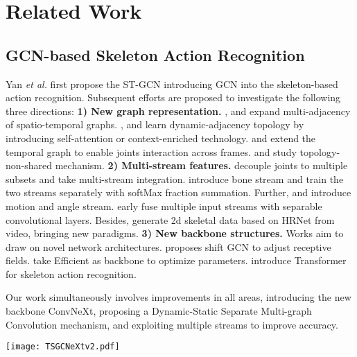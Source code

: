 \documentclass[10pt,twocolumn,letterpaper]{article}
\newcommand{\method}{TSGCNeXt\xspace}
\begin{document}
\section{Related Work}
\label{sec:related}
\subsection{GCN-based Skeleton Action Recognition}
\label{ssec:related_skeleton}
Yan \textit{et al.}\cite{yan2018spatial} first propose the ST-GCN introducing GCN into the skeleton-based action recognition. Subsequent efforts are proposed to investigate the following three directions:
\textbf{1) New graph representation.} \cite{li2019actional}, \cite{huang2020spatio} and \cite{liu2020disentangling} expand multi-adjacency of spatio-temporal graphs. \cite{shi2019two}, \cite{zhang2020semantics} and \cite{ye2020dynamic} learn dynamic-adjacency topology by introducing self-attention or context-enriched technology. \cite{obinata2021temporal} and \cite{zeng2021learning} extend the temporal graph to enable joints interaction across frames. \cite{cheng2020decoupling} and \cite{chen2021channel} study topology-non-shared mechanism.
\textbf{2) Multi-stream features.} \cite{song2020richly} decouple joints to multiple subsets and take multi-stream integration. \cite{li2019actional} introduce bone stream and train the two streams separately with softMax fraction summation. Further, \cite{shi2019skeleton} and \cite{qin2021fusing} introduce motion and angle stream. \cite{song2022constructing} early fuse multiple input streams with separable convolutional layers. Besides, \cite{duan2021revisiting} generate 2d skeletal data based on HRNet from video, bringing new paradigms.
\textbf{3) New backbone structures.} Works aim to draw on novel network architectures. \cite{cheng2020skeleton} proposes shift GCN to adjust receptive fields. \cite{song2022constructing} take Efficient as backbone to optimize parameters. \cite{bai2021gcst} introduce Transformer for skeleton action recognition. 

Our work simultaneously involves improvements in all areas, introducing the new backbone ConvNeXt, proposing a Dynamic-Static Separate Multi-graph Convolution mechanism, and exploiting multiple streams to improve accuracy.
\begin{figure*}[htp]
  \centering
  \texttt{[image: TSGCNeXtv2.pdf]}
  \caption{\label{fig:architecture}The overall pipeline of \method, including architecture and block details. The DS-SMG in red dashed box is the Dynamic-Static Separate Multi-graph Convolution. The compute ratio of three stage is designed to be $2:5:2$ or $4:3:2$.}
  \vspace{-1em}
\end{figure*}
\end{document}
